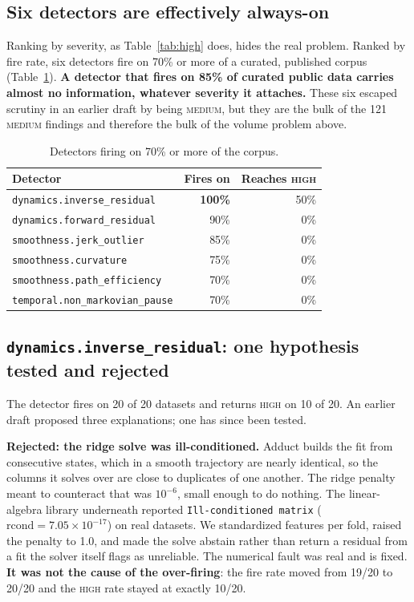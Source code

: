 \documentclass[10pt,a4paper]{article}
\newcommand{\dtr}[1]{\texttt{\small #1}}
\newcommand{\warn}[1]{\textcolor{critical}{\textbf{#1}}}
\begin{document}
\subsection{Six detectors are effectively always-on}
\label{sec:alwayson}

Ranking by severity, as Table~\ref{tab:high} does, hides the real problem. Ranked by fire
rate, six detectors fire on 70\% or more of a curated, published corpus
(Table~\ref{tab:alwayson}). \textbf{A detector that fires on 85\% of curated public data
carries almost no information, whatever severity it attaches.} These six escaped scrutiny in
an earlier draft by being \textsc{medium}, but they are the bulk of the 121 \textsc{medium}
findings and therefore the bulk of the volume problem above.

\begin{table}[tb]
\centering
\caption{Detectors firing on 70\% or more of the corpus.}
\label{tab:alwayson}
\small
\begin{tabular}{lrr}
\toprule
Detector & Fires on & Reaches \textsc{high} \\
\midrule
\dtr{dynamics.inverse\_residual}   & \warn{100\%} & 50\% \\
\dtr{dynamics.forward\_residual}   & 90\% & 0\% \\
\dtr{smoothness.jerk\_outlier}     & 85\% & 0\% \\
\dtr{smoothness.curvature}         & 75\% & 0\% \\
\dtr{smoothness.path\_efficiency}  & 70\% & 0\% \\
\dtr{temporal.non\_markovian\_pause} & 70\% & 0\% \\
\bottomrule
\end{tabular}
\end{table}

\subsection{\dtr{dynamics.inverse\_residual}: one hypothesis tested and rejected}
\label{sec:suspect}

The detector fires on 20 of 20 datasets and returns \textsc{high} on 10 of 20. An earlier
draft proposed three explanations; one has since been tested.

\textbf{Rejected: the ridge solve was ill-conditioned.} Adduct builds the fit from consecutive
states, which in a smooth trajectory are nearly identical, so the columns it solves over are
close to duplicates of one another. The ridge penalty meant to counteract that was
$10^{-6}$, small enough to do nothing. The linear-algebra library underneath reported
\dtr{Ill-conditioned matrix} ($\mathrm{rcond} = 7.05\times10^{-17}$) on real datasets. We
standardized features per fold, raised the penalty to 1.0, and made the solve abstain rather
than return a residual from a fit the solver itself flags as unreliable. The numerical fault
was real
and is fixed. \textbf{It was not the cause of the over-firing}: the fire rate moved from
19/20 to 20/20 and the \textsc{high} rate stayed at exactly 10/20.
\end{document}
